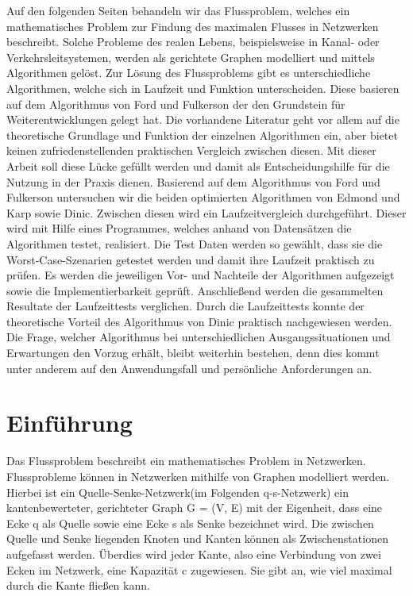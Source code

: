 \documentclass[a4paper]{llncs}
\begin{document}
Auf den folgenden Seiten behandeln wir das Flussproblem, welches ein mathematisches Problem zur Findung des maximalen Flusses in Netzwerken beschreibt.
 Solche Probleme des realen Lebens, beispielsweise in Kanal- oder Verkehrsleitsystemen, werden als gerichtete Graphen modelliert und mittels Algorithmen gelöst.
 Zur Lösung des Flussproblems gibt es unterschiedliche Algorithmen, welche sich in Laufzeit und Funktion unterscheiden. Diese basieren auf dem Algorithmus von Ford und Fulkerson der den Grundstein für Weiterentwicklungen gelegt hat.
 Die vorhandene Literatur geht vor allem auf die theoretische Grundlage und Funktion der einzelnen Algorithmen ein,  aber bietet keinen zufriedenstellenden praktischen Vergleich zwischen diesen.
 Mit dieser Arbeit soll diese Lücke gefüllt werden und damit als Entscheidungshilfe für die Nutzung in der Praxis dienen.
Basierend auf dem Algorithmus von Ford und Fulkerson untersuchen wir die beiden optimierten Algorithmen von Edmond und Karp sowie Dinic.
Zwischen diesen wird ein Laufzeitvergleich durchgeführt.
Dieser wird mit Hilfe eines Programmes, welches anhand von Datensätzen die Algorithmen testet, realisiert.
Die Test Daten werden so gewählt, dass sie die Worst-Case-Szenarien getestet werden und damit ihre Laufzeit praktisch zu prüfen.
Es werden die jeweiligen Vor- und Nachteile der Algorithmen aufgezeigt sowie die Implementierbarkeit geprüft. Anschließend werden die gesammelten Resultate der Laufzeittests verglichen.
Durch die Laufzeittests konnte der theoretische Vorteil des Algorithmus von Dinic praktisch nachgewiesen werden.
 Die Frage, welcher Algorithmus bei unterschiedlichen Ausgangssituationen und Erwartungen den Vorzug erhält, bleibt weiterhin bestehen, denn dies kommt unter anderem auf den Anwendungsfall und persönliche Anforderungen an.

\section{Einführung}
\label{Einfuehrung}
Das Flussproblem beschreibt ein mathematisches Problem in Netzwerken.\\

Flussprobleme k\"onnen in Netzwerken mithilfe von Graphen modelliert werden. Hierbei ist ein Quelle-Senke-Netzwerk(im Folgenden q-s-Netzwerk) ein kantenbewerteter, gerichteter Graph G = (V, E) mit der Eigenheit, dass eine Ecke q als Quelle sowie eine Ecke s als Senke bezeichnet wird. Die zwischen Quelle und Senke liegenden Knoten und Kanten können als Zwischenstationen aufgefasst werden. \"Uberdies wird jeder Kante, also eine Verbindung von zwei Ecken im Netzwerk, eine Kapazität c zugewiesen. Sie gibt an, wie viel maximal durch die Kante fließen kann. \citep{Testref}
\end{document}
